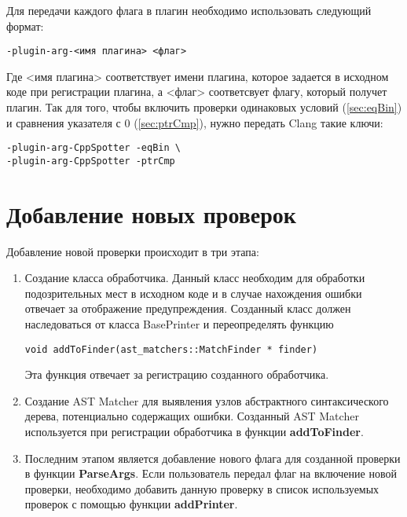 Для передачи каждого флага в плагин необходимо использовать следующий формат:
\begin{lstlisting}
-plugin-arg-<имя плагина> <флаг> 
\end{lstlisting}
Где <имя плагина> соответствует имени плагина, которое задается 
в исходном коде при регистрации плагина, а <флаг> соответсвует флагу, который получет плагин.
Так для того, чтобы включить проверки одинаковых условий (\ref{sec:eqBin}) и сравнения указателя с 0 (\ref{sec:ptrCmp}),
нужно передать Clang такие ключи:
\begin{lstlisting}
-plugin-arg-CppSpotter -eqBin \ 
-plugin-arg-CppSpotter -ptrCmp  
\end{lstlisting}


\section{Добавление новых проверок}
Добавление новой проверки происходит в три этапа:
\begin{enumerate}
	\item Создание класса обработчика. Данный класс необходим для обработки подозрительных мест
в исходном коде и в случае нахождения ошибки отвечает за отображение предупреждения. Созданный класс
должен наследоваться от класса BasePrinter и переопределять функцию
\begin{lstlisting}
void addToFinder(ast_matchers::MatchFinder * finder)
\end{lstlisting} 
Эта функция отвечает за регистрацию созданного обработчика.
	\item Создание AST Matcher для выявления узлов абстрактного синтаксического дерева, потенциально 
содержащих ошибки. Созданный AST Matcher используется при регистрации обработчика в функции 
\textbf{addToFinder}.
	\item Последним этапом является добавление нового флага для созданной проверки в функции 
\textbf{ParseArgs}. Если пользователь передал флаг на включение новой проверки, необходимо
добавить данную проверку в список используемых проверок с помощью функции \textbf{addPrinter}.
\end{enumerate}
